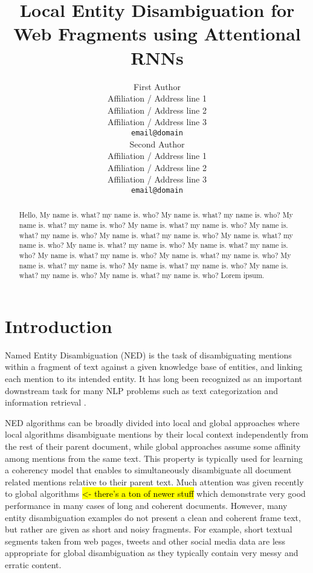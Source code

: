 \documentclass[11pt]{article}
\title{Local Entity Disambiguation for Web Fragments using Attentional RNNs}
\author{First Author \\
	Affiliation / Address line 1 \\
	Affiliation / Address line 2 \\
	Affiliation / Address line 3 \\
	{\tt email@domain} \\\And
	Second Author \\
	Affiliation / Address line 1 \\
	Affiliation / Address line 2 \\
	Affiliation / Address line 3 \\
	{\tt email@domain} \\}
\date{}
\begin{document}
	\maketitle
	\begin{abstract}
		Hello, My name is. what? my name is. who?
		My name is. what? my name is. who?
		My name is. what? my name is. who?
		My name is. what? my name is. who?
		My name is. what? my name is. who?
		My name is. what? my name is. who?
		My name is. what? my name is. who?
		My name is. what? my name is. who?
		My name is. what? my name is. who?
		My name is. what? my name is. who?
		My name is. what? my name is. who?
		My name is. what? my name is. who?
		My name is. what? my name is. who?
		My name is. what? my name is. who?
		My name is. what? my name is. who? Lorem ipsum.
	\end{abstract}
	
	\section{Introduction}
	
	Named Entity Disambiguation (NED) is the task of disambiguating mentions within a fragment of text against a given knowledge base of entities, and linking each mention to its intended entity. It has long been recognized as an important downstream task for many NLP problems such as text categorization \cite{gabrilovich2007computing} and information retrieval \cite{dalton2014entity}. 
	
	NED algorithms can be broadly divided into local and global approaches where local algorithms disambiguate mentions by their local context independently from the rest of their parent document, while global approaches assume some affinity among mentions from the same text. This property is typically used for learning a coherency model that enables to simultaneously disambiguate all document related mentions relative to their parent text. Much attention was given recently to global algorithms \cite{ratinov2011local,guo2014entity,pershina2015personalized} \hl{<- there's a ton of newer stuff} which demonstrate very good performance in many cases of long and coherent documents. However, many entity disambiguation examples do not present a clean and coherent frame text, but rather are given as short and noisy fragments. For example, short textual segments taken from web pages, tweets and other social media data are less appropriate for global disambiguation as they typically contain very messy and erratic content. 
	
\end{document}

